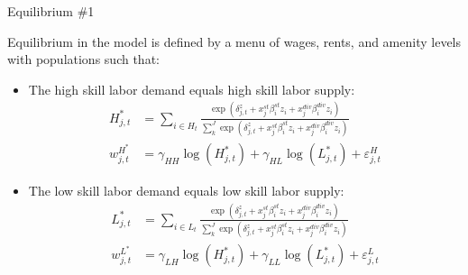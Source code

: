 \documentclass[aspectratio=169]{beamer}
\begin{document}

\begin{frame}{Equilibrium \#1}

Equilibrium in the model is defined by a menu of wages, rents, and amenity levels with populations such that:

\begin{itemize}
    \item<1-> The high skill labor demand equals high skill labor supply:
    \begin{equation}
        \begin{split}
            H_{j,t}^{*} &= \sum_{i \in H_{t}} \frac{\exp\left( \delta_{j,t}^{z} + x_{j}^{st}\beta_{i}^{st} z_{i} + x_{j}^{div} \beta_{i}^{div} z_{i} \right)}{\sum_{k}^{J} \exp\left( \delta_{j,t}^{z} + x_{j}^{st}\beta_{i}^{st} z_{i} + x_{j}^{div} \beta_{i}^{div} z_{i} \right)} \\
            w_{j,t}^{H^*} &= \gamma_{HH} \log \left( H_{j,t}^{*} \right) + \gamma_{HL} \log \left( L_{j,t}^{*} \right) + \varepsilon_{j,t}^{H} 
            \label{eq:wagehigh}
        \end{split}
    \end{equation}
    \item<2-> The low skill labor demand equals low skill labor supply:
    \begin{equation}
        \begin{split}
            L_{j,t}^{*} &= \sum_{i \in L_{t}} \frac{\exp\left( \delta_{j,t}^{z} + x_{j}^{st}\beta_{i}^{st} z_{i} + x_{j}^{div} \beta_{i}^{div} z_{i} \right)}{\sum_{k}^{J} \exp\left( \delta_{j,t}^{z} + x_{j}^{st}\beta_{i}^{st} z_{i} + x_{j}^{div} \beta_{i}^{div} z_{i} \right)} \\
            w_{j,t}^{L^*} &= \gamma_{LH} \log \left( H_{j,t}^{*} \right) + \gamma_{LL} \log \left( L_{j,t}^{*} \right) + \varepsilon_{j,t}^{L} 
            \label{eq:wagelow}
        \end{split}
    \end{equation}
\end{itemize}
    
\end{frame}

\end{document}

